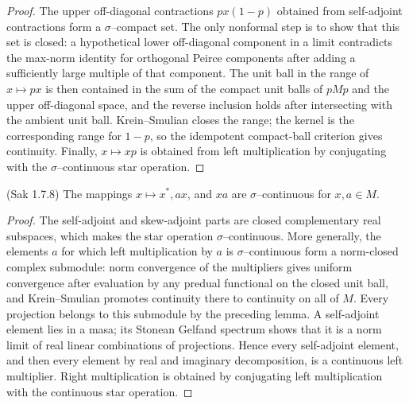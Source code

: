 \begin{proof}
  \leanok
  The upper off-diagonal contractions $px(1-p)$ obtained from self-adjoint contractions form a
  $\sigma$--compact set. The only nonformal step is to show that this set is closed: a hypothetical
  lower off-diagonal component in a limit contradicts the max-norm identity for orthogonal Peirce
  components after adding a sufficiently large multiple of that component. The unit ball in the
  range of $x\mapsto px$ is then contained in the sum of the compact unit balls of $pMp$ and the
  upper off-diagonal space, and the reverse inclusion holds after intersecting with the ambient unit
  ball. Krein--Smulian closes the range; the kernel is the corresponding range for $1-p$, so the
  idempotent compact-ball criterion gives continuity. Finally, $x\mapsto xp$ is obtained from left
  multiplication by conjugating with the $\sigma$--continuous star operation.
\end{proof}

\begin{lemma}
  \label{lem:star_left_mul_right_mul_sig_cts_Sak_1_7_8} (Sak 1.7.8)
  \leanok
  The mappings $x\mapsto x^{*},ax$, and $xa$ are $\sigma$--continuous for
  $x,a \in M$.
\end{lemma}

\begin{proof}
  \leanok
  The self-adjoint and skew-adjoint parts are closed complementary real subspaces, which makes the
  star operation $\sigma$--continuous. More generally, the elements $a$ for which left
  multiplication by $a$ is $\sigma$--continuous form a norm-closed complex submodule: norm
  convergence of the multipliers gives uniform convergence after evaluation by any predual
  functional on the closed unit ball, and Krein--Smulian promotes continuity there to continuity on
  all of $M$. Every projection belongs to this submodule by the preceding lemma. A self-adjoint
  element lies in a masa; its Stonean Gelfand spectrum shows that it is a norm limit of real linear
  combinations of projections. Hence every self-adjoint element, and then every element by real
  and imaginary decomposition, is a continuous left multiplier. Right multiplication is obtained
  by conjugating left multiplication with the continuous star operation.
\end{proof}

